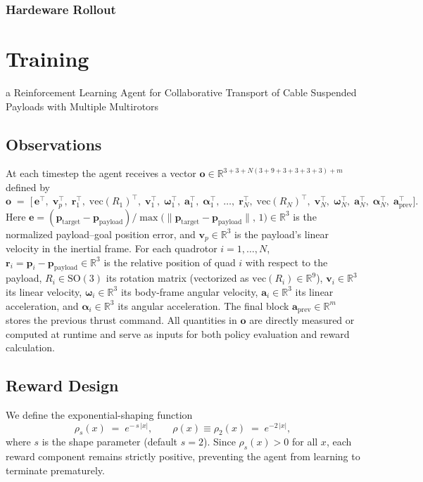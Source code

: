 \subsubsection{Hardeware Rollout}


\section{Training}
a Reinforcement Learning Agent for Collaborative Transport of Cable Suspended Payloads with Multiple Multirotors
\subsection{Observations}
At each timestep the agent receives a vector \(\mathbf{o}\in\mathbb{R}^{3+3+N(3+9+3+3+3+3)+m}\) defined by
\[
\mathbf{o} \;=\; 
\bigl[\,
\mathbf{e}^\top,\;\mathbf{v}_p^\top,\;
\mathbf{r}_1^\top,\;\mathrm{vec}(R_1)^\top,\;\mathbf{v}_1^\top,\;\boldsymbol\omega_1^\top,\;\mathbf{a}_1^\top,\;\boldsymbol\alpha_1^\top,\;\dots,\;
\mathbf{r}_N^\top,\;\mathrm{vec}(R_N)^\top,\;\mathbf{v}_N^\top,\;\boldsymbol\omega_N^\top,\;\mathbf{a}_N^\top,\;\boldsymbol\alpha_N^\top,\;
\mathbf{a}_{\mathrm{prev}}^\top
\!\bigr].
\]
Here \(\mathbf{e} = (\mathbf{p}_{\mathrm{target}} - \mathbf{p}_{\mathrm{payload}})/\max\bigl(\|\mathbf{p}_{\mathrm{target}} - \mathbf{p}_{\mathrm{payload}}\|,\,1\bigr)\in\mathbb{R}^3\) is the normalized payload–goal position error, and \(\mathbf{v}_p\in\mathbb{R}^3\) is the payload’s linear velocity in the inertial frame. For each quadrotor \(i=1,\ldots,N\), \(\mathbf{r}_i = \mathbf{p}_i - \mathbf{p}_{\mathrm{payload}}\in\mathbb{R}^3\) is the relative position of quad \(i\) with respect to the payload, \(R_i\in\mathrm{SO}(3)\) its rotation matrix (vectorized as \(\mathrm{vec}(R_i)\in\mathbb{R}^9\)), \(\mathbf{v}_i\in\mathbb{R}^3\) its linear velocity, \(\boldsymbol\omega_i\in\mathbb{R}^3\) its body-frame angular velocity, \(\mathbf{a}_i\in\mathbb{R}^3\) its linear acceleration, and \(\boldsymbol\alpha_i\in\mathbb{R}^3\) its angular acceleration. The final block \(\mathbf{a}_{\mathrm{prev}}\in\mathbb{R}^m\) stores the previous thrust command. All quantities in \(\mathbf{o}\) are directly measured or computed at runtime and serve as inputs for both policy evaluation and reward calculation.

\subsection{Reward Design}
We define the exponential-shaping function
\[
\rho_s(x) \;=\; e^{-\,s\,|x|},\qquad
\rho(x)\equiv\rho_{2}(x)\;=\;e^{-2\,|x|},
\]
where $s$ is the shape parameter (default $s=2$).  Since $\rho_s(x)>0$ for all $x$, each reward component remains strictly positive, preventing the agent from learning to terminate prematurely.

